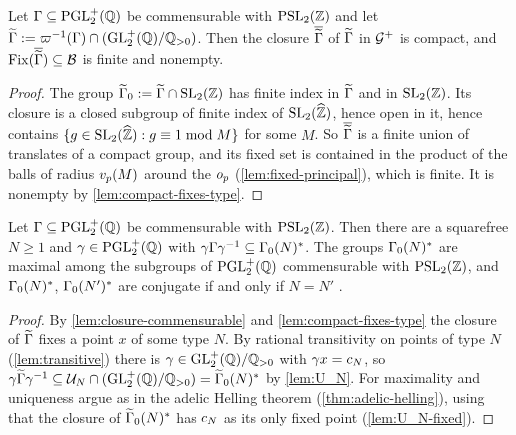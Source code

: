 \begin{lemma}\label{lem:closure-commensurable}
Let $\Gamma \subseteq \mathrm{PGL}_{2}^{+}(\mathbb{Q})$ be commensurable with
$\PSL{2}{\ZZ}$ and let $\widetilde{\Gamma} := \varpi^{-1}(\Gamma) \cap
(\mathrm{GL}_{2}^{+}(\mathbb{Q})/\mathbb{Q}_{>0})$. Then the closure $\overline{\widetilde{\Gamma}}$ of
$\widetilde{\Gamma}$ in $\mathcal{G}^{+}$ is compact, and $\mathrm{Fix}(\overline{\widetilde{\Gamma}})
\subseteq \mathcal{B}$ is finite and nonempty.
\end{lemma}

\begin{proof}
The group $\lifted{\Gamma}_0 := \lifted{\Gamma} \cap \SL{2}{\ZZ}$ has finite
index in $\widetilde{\Gamma}$ and in $\SL{2}{\ZZ}$. Its closure is a closed
subgroup of finite index of $\SL{2}{\ProfiniteIntegers}$, hence open in it,
hence contains $\{g \in \SL{2}{\ProfiniteIntegers} : g \equiv 1 \bmod M\}$ for
some $M$. So $\overline{\widetilde{\Gamma}}$ is a finite union of translates of a
compact group, and its fixed set is contained in the product of the balls
of radius $v_{p}(M)$ around the $o_{p}$
(\cref{lem:fixed-principal}), which is finite. It is nonempty by
\cref{lem:compact-fixes-type}.
\end{proof}

\begin{corollary}\label{cor:helling}
Let $\Gamma \subseteq \mathrm{PGL}_{2}^{+}(\mathbb{Q})$ be commensurable with
$\PSL{2}{\ZZ}$. Then there are a squarefree $N \geq 1$ and
$\gamma \in \mathrm{PGL}_{2}^{+}(\mathbb{Q})$ with $\gamma\Gamma\gamma^{-1} \subseteq
\GammaZeroStar{N}$. The groups $\GammaZeroStar{N}$ are maximal among the
subgroups of $\mathrm{PGL}_{2}^{+}(\mathbb{Q})$ commensurable with $\PSL{2}{\ZZ}$, and
$\GammaZeroStar{N}$, $\GammaZeroStar{N'}$ are conjugate if and only if
$N = N'$ \cite{Helling1970}.
\end{corollary}

\begin{proof}
By \cref{lem:closure-commensurable} and \cref{lem:compact-fixes-type} the
closure of $\widetilde{\Gamma}$ fixes a point $x$ of some type $N$. By rational
transitivity on points of type $N$ (\cref{lem:transitive}) there is
$\gamma \in \mathrm{GL}_{2}^{+}(\mathbb{Q})/\mathbb{Q}_{>0}$ with $\gamma x = c_{N}$, so
$\gamma\lifted{\Gamma}\gamma^{-1} \subseteq \MaxCompact{N} \cap
(\RationalLiftGroup) = \GammaZeroStar[lift]{N}$ by \cref{lem:U_N}. For
maximality and uniqueness argue as in the adelic Helling theorem
(\cref{thm:adelic-helling}), using that the closure of
$\GammaZeroStar[lift]{N}$ has $c_{N}$ as its only fixed point
(\cref{lem:U_N-fixed}).
\end{proof}

